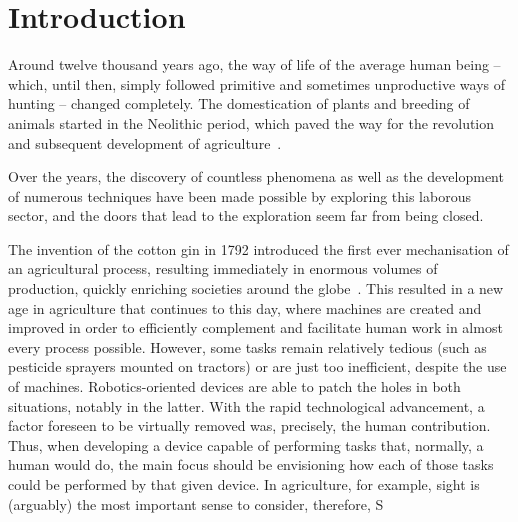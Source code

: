 




\chapter{Introduction}\label{cha:I_introduction}

Around twelve thousand years ago, the way of life of the average human being -- which, until then, simply followed primitive and sometimes unproductive ways of hunting -- changed completely. The domestication of plants and breeding of animals started in the Neolithic period, which paved the way for the revolution and subsequent development of agriculture~\cite{Zeder2011TheOO}.

Over the years, the discovery of countless phenomena as well as the development of numerous techniques have been made possible by exploring this laborous sector, and the doors that lead to the exploration seem far from being closed.

The invention of the cotton gin in 1792 introduced the first ever mechanisation of an agricultural process, resulting immediately in enormous volumes of production, quickly enriching societies around the globe~\cite{Roe1926}.
This resulted in a new age in agriculture that continues to this day, where machines are created and improved in order to efficiently complement and facilitate human work in almost every process possible.
However, some tasks remain relatively tedious (such as pesticide sprayers mounted on tractors) or are just too inefficient, despite the use of machines. Robotics-oriented devices are able to patch the holes in both situations, notably in the latter.
With the rapid technological advancement, a factor foreseen to be virtually removed was, precisely, the human contribution. Thus, when developing a device capable of performing tasks that, normally, a human would do, the main focus should be envisioning how each of those tasks could be performed by that given device. In agriculture, for example, sight is (arguably) the most important sense to consider, therefore, S

